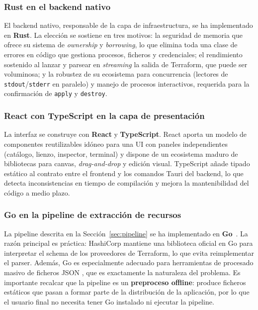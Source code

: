 \documentclass{article}
\begin{document}
{        \subsubsection*{Rust en el backend nativo}
        \justify
        El backend nativo, responsable de la capa de infraestructura, se ha implementado
        en \textbf{Rust}. La elección se sostiene en tres motivos: la seguridad de
        memoria que ofrece su sistema de \textit{ownership} y \textit{borrowing}, lo que
        elimina toda una clase de errores en código que gestiona procesos, ficheros y
        credenciales; el rendimiento sostenido al lanzar y parsear en \textit{streaming}
        la salida de Terraform, que puede ser voluminosa; y la robustez de su ecosistema
        para concurrencia (lectores de \texttt{stdout}/\texttt{stderr} en paralelo) y
        manejo de procesos interactivos, requerida para la confirmación de \texttt{apply}
        y \texttt{destroy}.

        \subsubsection*{React con TypeScript en la capa de presentación}
        \justify
        La interfaz se construye con \textbf{React} y \textbf{TypeScript}. React aporta
        un modelo de componentes reutilizables idóneo para una UI con paneles
        independientes (catálogo, lienzo, inspector, terminal) y dispone de un
        ecosistema maduro de bibliotecas para canvas, \textit{drag-and-drop} y edición
        visual. TypeScript añade tipado estático al contrato entre el frontend y los
        comandos Tauri del backend, lo que detecta inconsistencias en tiempo de
        compilación y mejora la mantenibilidad del código a medio plazo.

        \subsubsection*{Go en la pipeline de extracción de recursos}
        \justify
        La pipeline descrita en la Sección~\ref{sec:pipeline} se ha implementado en
        \textbf{Go}~\cite{noauthor_go_nodate}. La razón principal es práctica: HashiCorp mantiene una biblioteca
        oficial en Go para interpretar el schema de los proveedores de Terraform, lo
        que evita reimplementar el parser. Además, Go es especialmente adecuado para
        herramientas de procesado masivo de ficheros JSON \cite{noauthor_json_nodate}, que es exactamente la
        naturaleza del problema. Es importante recalcar que la pipeline es un
        \textbf{preproceso offline}: produce ficheros estáticos que pasan a formar parte
        de la distribución de la aplicación, por lo que el usuario final no necesita
        tener Go instalado ni ejecutar la pipeline.

}
\end{document}

